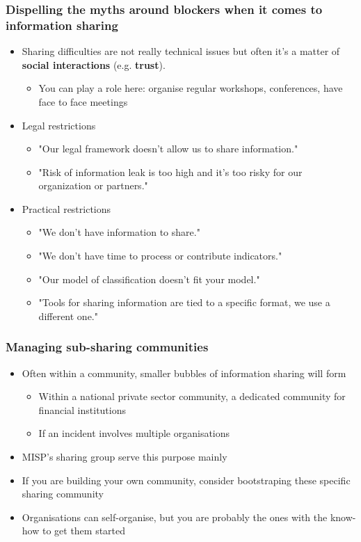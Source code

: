\begin{frame}
    \frametitle{Dispelling the myths around blockers when it comes to information sharing}
    \begin{itemize}
        \item Sharing difficulties are not really technical issues but often it's a matter of {\bf social interactions} (e.g. {\bf trust}).
        \begin{itemize}
            \item You can play a role here: organise regular workshops, conferences, have face to face meetings
        \end{itemize}
        \item Legal restrictions
        \begin{itemize}
            \item "Our legal framework doesn't allow us to share information."
            \item "Risk of information leak is too high and it's too risky for our organization or partners."
        \end{itemize}
        \item Practical restrictions
        \begin{itemize}
            \item "We don't have information to share."
            \item "We don't have time to process or contribute indicators."
            \item "Our model of classification doesn't fit your model."
            \item "Tools for sharing information are tied to a specific format, we use a different one."
        \end{itemize}
    \end{itemize}
\end{frame}

\begin{frame}
    \frametitle{Managing sub-sharing communities}
    \begin{itemize}
        \item Often within a community, smaller bubbles of information sharing will form
        \begin{itemize}
            \item Within a national private sector community, a dedicated community for financial institutions
            \item If an incident involves multiple organisations
        \end{itemize}
        \item MISP's sharing group serve this purpose mainly
        \item If you are building your own community, consider bootstraping these specific sharing community
        \item Organisations can self-organise, but you are probably the ones with the know-how to get them started
    \end{itemize}
\end{frame}

